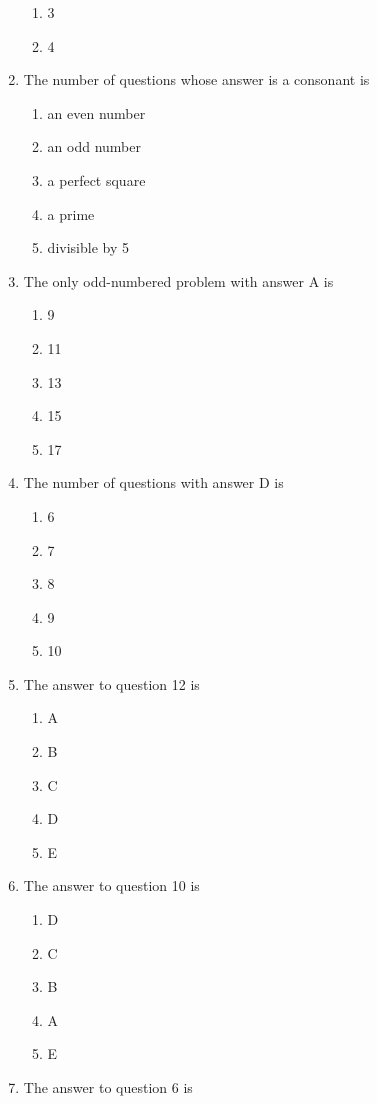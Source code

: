 \documentclass[twoside]{article}
\begin{document}
\begin{enumerate}
\begin{enumerate}[label=(\Alph*)]
	\item 3
	\item 4
	\end{enumerate}
\item The number of questions whose answer is a consonant is
	\begin{enumerate}[label=(\Alph*)]
	\item an even number
	\item an odd number
	\item a perfect square
	\item a prime
	\item divisible by 5
	\end{enumerate}
\item The only odd-numbered problem with answer A is
	\begin{enumerate}[label=(\Alph*)]
	\item 9
	\item 11
	\item 13
	\item 15
	\item 17
	\end{enumerate}
\item The number of questions with answer D is
	\begin{enumerate}[label=(\Alph*)]
	\item 6
	\item 7
	\item 8
	\item 9
	\item 10
	\end{enumerate}
\item The answer to question 12 is
	\begin{enumerate}[label=(\Alph*)]
	\item A
	\item B
	\item C
	\item D
	\item E
	\end{enumerate}
\item The answer to question 10 is
	\begin{enumerate}[label=(\Alph*)]
	\item D
	\item C
	\item B
	\item A
	\item E
	\end{enumerate}
\newpage
\item The answer to question 6 is

\end{enumerate}
\end{document}

